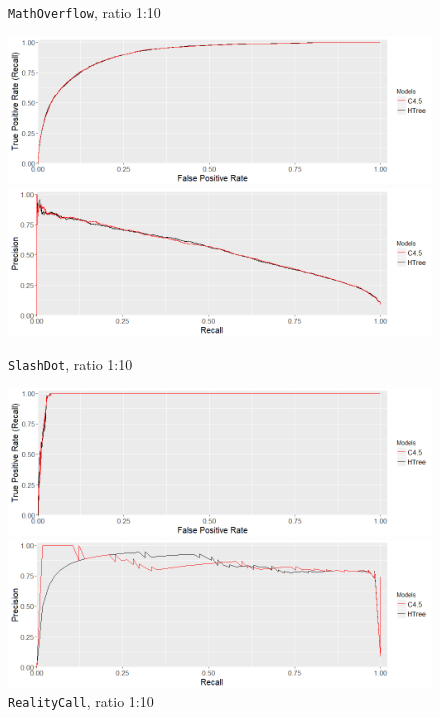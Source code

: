 \documentclass{acm_proc_article-sp}
\begin{document}
\begin{figure}
\begin{multicols}{2}
	\end{multicols}
	\caption{\texttt{MathOverflow}, ratio 1:10}
	\label{MathOverflow}
	\begin{multicols}{2}
		\includegraphics[width=\linewidth]{SlashDot_ROC}\par
		\includegraphics[width=\linewidth]{SlashDot_PR}\par
	\end{multicols}
	\caption{\texttt{SlashDot}, ratio 1:10}
	\label{SlashDot}
	\begin{multicols}{2}
		\includegraphics[width=\linewidth]{RealityMining_ROC_1_10}\par
		\includegraphics[width=\linewidth]{RealityMining_PR_1_10}\par
	\end{multicols}
	\caption{\texttt{RealityCall}, ratio 1:10}
	\label{RealityCall10}
\end{figure}
\end{document}
